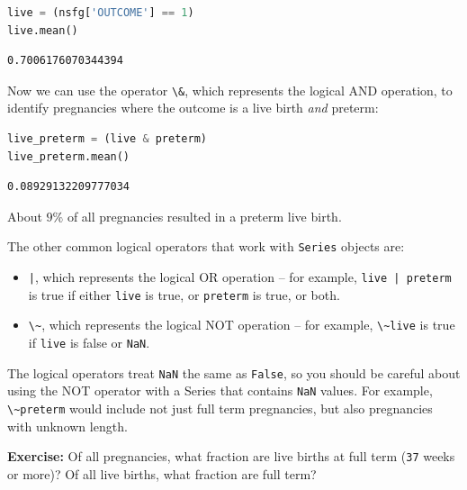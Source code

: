 \begin{lstlisting}[language=Python,style=source]
live = (nsfg['OUTCOME'] == 1)
live.mean()
\end{lstlisting}

\begin{lstlisting}[style=output]
0.7006176070344394
\end{lstlisting}

Now we can use the operator \passthrough{\lstinline!\&!}, which
represents the logical AND operation, to identify pregnancies where the
outcome is a live birth \emph{and} preterm:

\begin{lstlisting}[language=Python,style=source]
live_preterm = (live & preterm)
live_preterm.mean()
\end{lstlisting}

\begin{lstlisting}[style=output]
0.08929132209777034
\end{lstlisting}

About \(9\%\) of all pregnancies resulted in a preterm live birth.

The other common logical operators that work with
\passthrough{\lstinline!Series!} objects are:

\begin{itemize}
\item
  \passthrough{\lstinline!|!}, which represents the logical OR operation
  -- for example, \passthrough{\lstinline!live | preterm!} is true if
  either \passthrough{\lstinline!live!} is true, or
  \passthrough{\lstinline!preterm!} is true, or both.
\item
  \passthrough{\lstinline!\~!}, which represents the logical NOT
  operation -- for example, \passthrough{\lstinline!\~live!} is true if
  \passthrough{\lstinline!live!} is false or
  \passthrough{\lstinline!NaN!}.
\end{itemize}

The logical operators treat \passthrough{\lstinline!NaN!} the same as
\passthrough{\lstinline!False!}, so you should be careful about using
the NOT operator with a Series that contains
\passthrough{\lstinline!NaN!} values. For example,
\passthrough{\lstinline!\~preterm!} would include not just full term
pregnancies, but also pregnancies with unknown length.

\textbf{Exercise:} Of all pregnancies, what fraction are live births at
full term (\passthrough{\lstinline!37!} weeks or more)? Of all live
births, what fraction are full term?

